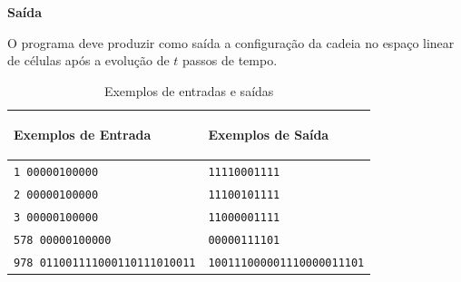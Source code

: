 \vspace{0.3cm}
\textbf{Saída}

O programa deve produzir como saída a configuração da cadeia no espaço linear de células após a evolução
de $t$ passos de tempo.

\begin{table}[h]
    \centering
    \footnotesize
    \begin{tabular}{|p{8cm}|p{8cm}|}
        \hline
        \begin{center}
            \vspace{-0.3cm}
            \textbf{Exemplos de Entrada}
            \vspace{-0.3cm}
        \end{center} 
         &  
        \begin{center}
            \vspace{-0.3cm}
            \textbf{Exemplos de Saída}
            \vspace{-0.3cm}
        \end{center} \\ \hline
		    \texttt{1 00000100000} & \texttt{11110001111} \\
         \hline
   		    \texttt{2 00000100000} & \texttt{11100101111} \\
         \hline    
   		    \texttt{3 00000100000} & \texttt{11000001111} \\
         \hline    
   		    \texttt{578 00000100000} & \texttt{00000111101} \\
         \hline    
   		    \texttt{978 011001111000110111010011} & \texttt{100111000001110000011101} \\
         \hline    
    \end{tabular}
    \caption{Exemplos de entradas e saídas}    
\end{table}

\normalsize

\newpage

\begin{center}
\noindent

\end{center}